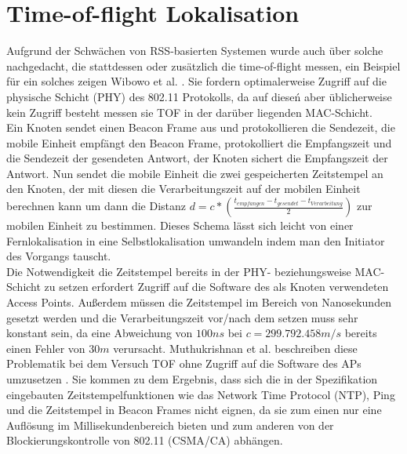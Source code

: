 \section{Time-of-flight Lokalisation}
\label{ch:Vorherige:sec:TOF}
Aufgrund der Schwächen von RSS-basierten Systemen wurde auch über solche nachgedacht, die stattdessen oder zusätzlich die time-of-flight messen, ein Beispiel für ein solches zeigen Wibowo et al. \cite{wibowo2009time}. 
Sie fordern optimalerweise Zugriff auf die physische Schicht (PHY) des 802.11 Protokolls, da auf dieseń aber üblicherweise kein Zugriff besteht messen sie TOF in der darüber liegenden MAC-Schicht.\\
Ein Knoten sendet einen Beacon Frame aus und protokollieren die Sendezeit, die mobile Einheit empfängt den Beacon Frame, protokolliert die Empfangszeit und die Sendezeit der gesendeten Antwort, der Knoten sichert die Empfangszeit der Antwort.
Nun sendet die mobile Einheit die zwei gespeicherten Zeitstempel an den Knoten, der mit diesen die Verarbeitungszeit auf der mobilen Einheit berechnen kann um dann die Distanz $d = c*(\frac{t_{empfangen} - t_{gesendet} - t_{Verarbeitung}}{2})$ zur mobilen Einheit zu bestimmen.
Dieses Schema lässt sich leicht von einer Fernlokalisation in eine Selbstlokalisation umwandeln indem man den Initiator des Vorgangs tauscht.\\
Die Notwendigkeit die Zeitstempel bereits in der PHY- beziehungsweise MAC-Schicht zu setzen erfordert Zugriff auf die Software des als Knoten verwendeten Access Points. 
Außerdem müssen die Zeitstempel im Bereich von Nanosekunden gesetzt werden und die Verarbeitungszeit vor/nach dem setzen muss sehr konstant sein, da eine Abweichung von $100ns$ bei $c = 299.792.458m/s$ bereits einen Fehler von $30m$ verursacht.
Muthukrishnan et al. beschreiben diese Problematik bei dem Versuch TOF ohne Zugriff auf die Software des APs umzusetzen \cite{muthukrishnan2006using}.
Sie kommen zu dem Ergebnis, dass sich die in der Spezifikation eingebauten Zeitstempelfunktionen wie das Network Time Protocol (NTP), Ping und die Zeitstempel in Beacon Frames nicht eignen, da sie zum einen nur eine Auflösung im Millisekundenbereich bieten und zum anderen von der Blockierungskontrolle von 802.11 (CSMA/CA) abhängen.

